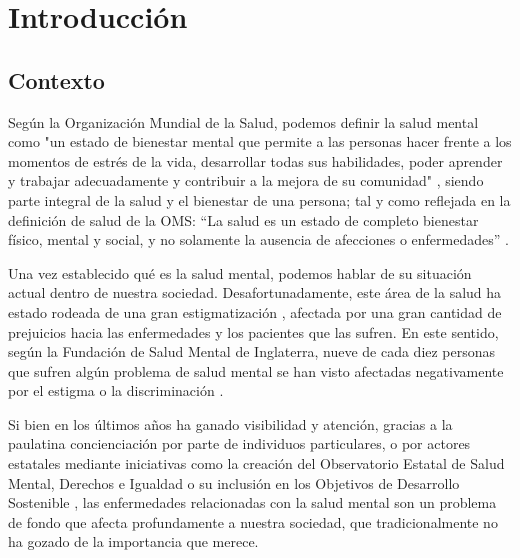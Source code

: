 \chapter{Introducción}
\label{chapter:introduccion}


\section{Contexto}


Según la Organización Mundial de la Salud, podemos definir la salud mental como "un estado de bienestar mental que permite a las personas hacer frente a los momentos de estrés de la vida, desarrollar todas sus habilidades, poder aprender y trabajar adecuadamente y contribuir a la mejora de su comunidad" \cite{oms_salud_2022}, siendo parte integral de la salud y el bienestar de una persona; tal y como reflejada en la definición de salud de la OMS: “La salud es un estado de completo bienestar físico, mental y social, y no solamente la ausencia de afecciones o enfermedades” \cite{feafes_galicia_que_nodate}. 

Una vez establecido qué es la salud mental, podemos hablar de su situación actual dentro de nuestra sociedad. Desafortunadamente, este área de la salud ha estado rodeada de una gran estigmatización \cite{delgado_rompiendo_2021}  \cite{andres_tallarda_combatir_2020}, afectada por una gran cantidad de prejuicios hacia las enfermedades y los pacientes que las sufren. En este sentido, según la Fundación de Salud Mental de Inglaterra, nueve de cada diez personas que sufren algún problema de salud mental se han visto afectadas negativamente por el estigma o la discriminación \cite{mental_health_foundation_stigma_nodate}.

Si bien en los últimos años ha ganado visibilidad y atención, gracias a la paulatina concienciación por parte de individuos particulares, o por actores estatales mediante iniciativas como la creación del 
Observatorio Estatal de Salud Mental, Derechos e Igualdad \cite{comunicacion_nace_2022} o su inclusión en los Objetivos de Desarrollo Sostenible \cite{oms_salud_nodate},  las enfermedades relacionadas con la salud mental son un problema de fondo que afecta profundamente a nuestra sociedad, que tradicionalmente no ha gozado de la importancia que merece.

